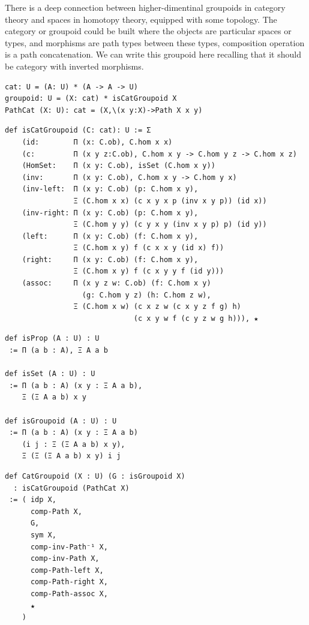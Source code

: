 \documentclass{article}
\theoremstyle{definition}
\begin{document}
There is a deep connection between higher-dimentinal groupoids in category theory and
spaces in homotopy theory, equipped with some topology. The category or groupoid could
be built where the objects are particular spaces or types, and morphisms are path types
between these types, composition operation is a path concatenation. We can write this
groupoid here recalling that it should be category with inverted morphisms.

\begin{lstlisting}
cat: U = (A: U) * (A -> A -> U)
groupoid: U = (X: cat) * isCatGroupoid X
PathCat (X: U): cat = (X,\(x y:X)->Path X x y)
\end{lstlisting}

\begin{lstlisting}
def isCatGroupoid (C: cat): U := Σ
    (id:        Π (x: C.ob), C.hom x x)
    (c:         Π (x y z:C.ob), C.hom x y -> C.hom y z -> C.hom x z)
    (HomSet:    Π (x y: C.ob), isSet (C.hom x y))
    (inv:       Π (x y: C.ob), C.hom x y -> C.hom y x)
    (inv-left:  Π (x y: C.ob) (p: C.hom x y),
                Ξ (C.hom x x) (c x y x p (inv x y p)) (id x))
    (inv-right: Π (x y: C.ob) (p: C.hom x y),
                Ξ (C.hom y y) (c y x y (inv x y p) p) (id y))
    (left:      Π (x y: C.ob) (f: C.hom x y),
                Ξ (C.hom x y) f (c x x y (id x) f))
    (right:     Π (x y: C.ob) (f: C.hom x y),
                Ξ (C.hom x y) f (c x y y f (id y)))
    (assoc:     Π (x y z w: C.ob) (f: C.hom x y)
                  (g: C.hom y z) (h: C.hom z w),
                Ξ (C.hom x w) (c x z w (c x y z f g) h)
                              (c x y w f (c y z w g h))), ★
\end{lstlisting}

\newpage
\begin{lstlisting}
def isProp (A : U) : U
 := Π (a b : A), Ξ A a b

def isSet (A : U) : U
 := Π (a b : A) (x y : Ξ A a b),
    Ξ (Ξ A a b) x y

def isGroupoid (A : U) : U
 := Π (a b : A) (x y : Ξ A a b)
    (i j : Ξ (Ξ A a b) x y),
    Ξ (Ξ (Ξ A a b) x y) i j
\end{lstlisting}

\begin{lstlisting}
def CatGroupoid (X : U) (G : isGroupoid X)
  : isCatGroupoid (PathCat X)
 := ( idp X,
      comp-Path X,
      G,
      sym X,
      comp-inv-Path⁻¹ X,
      comp-inv-Path X,
      comp-Path-left X,
      comp-Path-right X,
      comp-Path-assoc X,
      ★
    )
\end{lstlisting}
\end{document}

